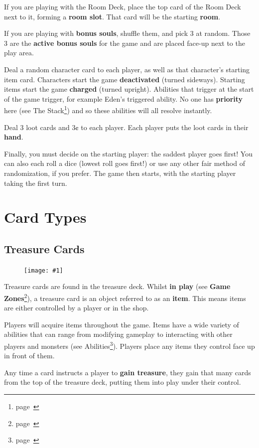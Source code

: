 \documentclass[
  fontsize=10pt,
  paper=a5,
  version=last,
  chapterprefix=true,
  bindingoffset=5mm,
  ]{scrbook}
\newcommand{\cardw}{0.3\textwidth}
\newcommand{\cardfigv}[1]{
    \begin{figure}
        \texttt{[image: \#1]}
    \end{figure}
}
\begin{document}
    If you are playing with the Room Deck, place the top card of the Room Deck next to it, forming a \textbf{room slot}. That card will be the starting \textbf{room}.

    If you are playing with \textbf{bonus souls}, shuffle them, and pick 3 at random. Those 3 are the \textbf{active bonus souls} for the game and are placed face-up next to the play area.

    Deal a random character card to each player, as well as that character’s starting item card. Characters start the game \textbf{deactivated} (turned sideways). Starting items start the game \textbf{charged} (turned upright). Abilities that trigger at the start of the game trigger, for example Eden’s triggered ability. No one has \textbf{priority} here (see The Stack\footnote{page~\pageref{stack}}) and so these abilities will all resolve instantly.

    Deal 3 loot cards and 3¢ to each player. Each player puts the loot cards in their \textbf{hand}.

    Finally, you must decide on the starting player: the saddest player goes first! You can also each roll a dice (lowest roll goes first!) or use any other fair method of randomization, if you prefer. The game then starts, with the starting player taking the first turn.
    
    \chapter{Card Types}
    \label{types}
    \section{Treasure Cards}
    \cardfigv{assets/treasure.png}
    Treasure cards are found in the treasure deck. Whilst \textbf{in play} (see \textbf{Game Zones}\footnote{page~\pageref{zones}}), a treasure card is an object referred to as an \textbf{item}. This means items are either controlled by a player or in the shop.
  
    Players will acquire items throughout the game. Items have a wide variety of abilities that can range from modifying gameplay to interacting with other players and monsters (see Abilities\footnote{page~\pageref{abilities}}). Players place any items they control face up in front of them.
  
    Any time a card instructs a player to \textbf{gain treasure}, they gain that many cards from the top of the treasure deck, putting them into play under their control.
  
\end{document}
